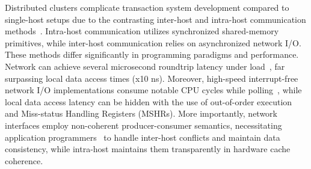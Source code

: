 
Distributed clusters complicate transaction system development compared to single-host setups due to the contrasting inter-host and intra-host communication methods~\cite{directcxl, gam, farm, fasst}. Intra-host communication utilizes synchronized shared-memory primitives, while inter-host communication relies on asynchronized network I/O. These methods differ significantly in programming paradigms and performance. Network can achieve several microsecond roundtrip latency under load~\cite{directcxl, gam, farm, fasst}, far surpassing local data access times (x10 ns). Moreover, high-speed interrupt-free network I/O implementations consume notable CPU cycles while polling~\cite{fasst, drtmh, herd_sigcomm14, pilaf_atc13, herd_sigcomm14}, while local data access latency can be hidden with the use of out-of-order execution and Miss-status Handling Registers (MSHRs). More importantly, network interfaces employ non-coherent producer-consumer semantics, necessitating application programmers~\cite{gam, concordia_fast21, grappa_atc15} to handle inter-host conflicts and maintain data consistency, while intra-host maintains them transparently in hardware cache coherence. 



